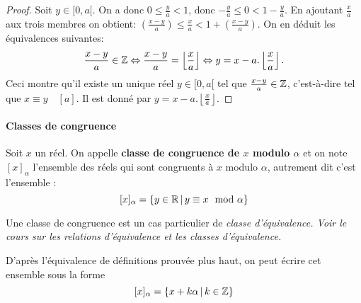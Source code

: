 \begin{proof}
Soit $y \in [0,a[$. On a donc $0\leq \frac{y}{a} < 1$, donc $-\frac{y}{a}\leq 0 < 1 -\frac{y}{a}$. En ajoutant $\frac{x}{a}$ aux trois membres on obtient: $\left(\frac{x-y}{a}\right)\leq \frac{x}{a} < 1 +\left(\frac{x-y}{a}\right)$.
On en déduit les équivalences suivantes:
\[ \frac{x-y}{a} \in \mathbb{Z} \Leftrightarrow \frac{x-y}{a} = \left\lfloor \frac{x}{a}\right\rfloor \Leftrightarrow y=x-a.\left\lfloor\frac{x}{a}\right\rfloor.\]
Ceci montre qu'il existe un unique réel $y \in [0,a[$ tel que $ \frac{x-y}{a} \in \mathbb{Z}$, c'est-à-dire tel que $x \equiv y\quad [a]$. Il est donné par $y=x-a.\left\lfloor\frac{x}{a}\right\rfloor$.
\end{proof}

\paragraph{Classes de congruence}



\begin{definition}
Soit $x$ un réel. On appelle \textbf{classe de congruence de $x$ modulo $\alpha$} et on note $[x]_\alpha$  l'ensemble des réels qui sont congruents à $x$ modulo $\alpha$, autrement dit c'est l'ensemble : 
\[ [x]_\alpha=\ensemble{y\in\R}{y\equiv x \mod \alpha}\]

\end{definition}
\begin{remarque}
Une classe de congruence est un cas particulier de \emph{classe d'équivalence. Voir le cours sur les relations d'équivalence et les classes d'équivalence.}
\end{remarque}
D'après l'équivalence de définitions prouvée plus haut, on peut écrire cet ensemble sous la forme
\[ [x]_\alpha=\ensemble {x+k\alpha}{k\in\Z}\]
